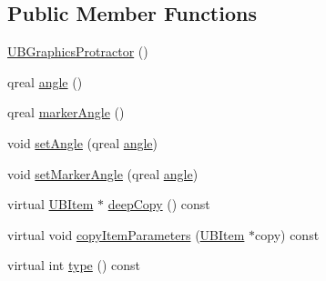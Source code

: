 \subsection*{Public Member Functions}
\begin{DoxyCompactItemize}
\item 
\hyperlink{class_u_b_graphics_protractor_aa6b25a89c234aa8a672b2c3c4dfbc198}{U\-B\-Graphics\-Protractor} ()
\item 
qreal \hyperlink{class_u_b_graphics_protractor_a15353b85e594aa185d56f748409b88a4}{angle} ()
\item 
qreal \hyperlink{class_u_b_graphics_protractor_afccf0ab5e313136401f06c59929c9a75}{marker\-Angle} ()
\item 
void \hyperlink{class_u_b_graphics_protractor_ab9c6822def18b4c6c4e34656499e7460}{set\-Angle} (qreal \hyperlink{class_u_b_graphics_protractor_a15353b85e594aa185d56f748409b88a4}{angle})
\item 
void \hyperlink{class_u_b_graphics_protractor_a227204f8d0322912d717e7d4c425da34}{set\-Marker\-Angle} (qreal \hyperlink{class_u_b_graphics_protractor_a15353b85e594aa185d56f748409b88a4}{angle})
\item 
virtual \hyperlink{class_u_b_item}{U\-B\-Item} $\ast$ \hyperlink{class_u_b_graphics_protractor_a36c6ab509cee1d80a9e717b07bf2eda1}{deep\-Copy} () const 
\item 
virtual void \hyperlink{class_u_b_graphics_protractor_a4ac849a2b7e1dd840b694082e20fd6ed}{copy\-Item\-Parameters} (\hyperlink{class_u_b_item}{U\-B\-Item} $\ast$copy) const 
\item 
virtual int \hyperlink{class_u_b_graphics_protractor_a800a03d895d6d3961b46c7a1a8774670}{type} () const 
\end{DoxyCompactItemize}
